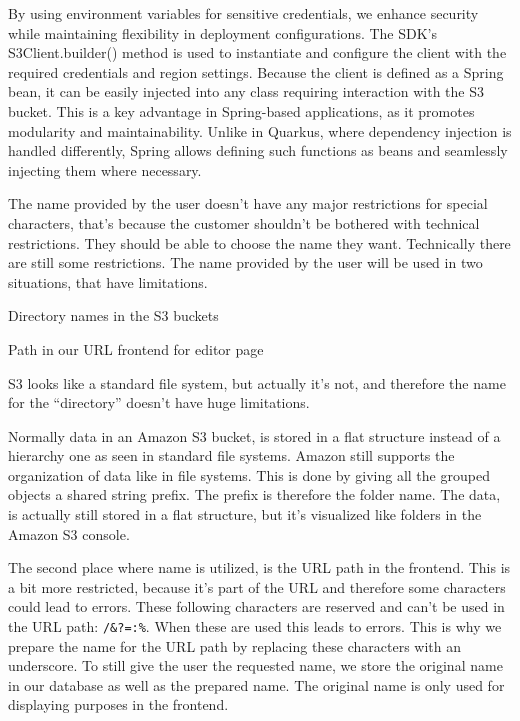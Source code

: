 By using environment variables for sensitive credentials, we enhance security while maintaining flexibility in deployment configurations.
The SDK’s S3Client.builder() method is used to instantiate and configure the client with the required credentials and region settings. Because the client is defined as a Spring bean, it can be easily injected into any class requiring interaction with the S3 bucket. This is a key advantage in Spring-based applications, as it promotes modularity and maintainability. Unlike in Quarkus, where dependency injection is handled differently, Spring allows defining such functions as beans and seamlessly injecting them where necessary.

The name provided by the user doesn't have any major restrictions for special characters, that's because the customer shouldn't be bothered with technical restrictions. They should be able to choose the name they want. Technically there are still some restrictions. The name provided by the user will be used in two situations, that have limitations. 
\begin{compactenum}
    \item Directory names in the S3 buckets
    \item Path in our URL frontend for editor page
\end{compactenum}

S3 looks like a standard file system, but actually it's not, and therefore the name for the ``directory'' doesn't have huge limitations. 

Normally data in an Amazon S3 bucket, is stored in a flat structure instead of a hierarchy one as seen in standard file systems. Amazon still supports the organization of data like in file systems. This is done by giving all the grouped objects a shared string prefix. The prefix is therefore the folder name. The data, is actually still stored in a flat structure, but it's visualized like folders in the Amazon S3 console.

The second place where name is utilized, is the URL path in the frontend. This is a bit more restricted, because it's part of the URL and therefore some characters could lead to errors. These following characters are reserved and can't be used in the URL path: \texttt{/\&?=:\%}. When these are used this leads to errors. This is why we prepare the name for the URL path by replacing these characters with an underscore. To still give the user the requested name, we store the original name in our database as well as the prepared name. The original name is only used for displaying purposes in the frontend.

